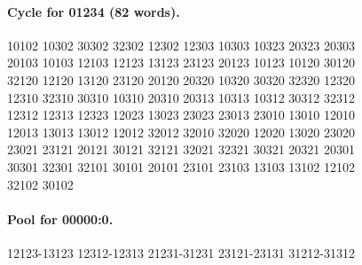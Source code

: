 \documentclass[11pt]{article}
\numberwithin{equation}{section}
\numberwithin{table}{section}
\begin{document}
\paragraph{Cycle for 01234 (82 words).}
\begingroup\footnotesize\ttfamily\begin{flushleft}
10102 10302 30302 32302 12302 12303 10303 10323 20323 20303\\
20103 10103 12103 12123 13123 23123 20123 10123 10120 30120\\
32120 12120 13120 23120 20120 20320 10320 30320 32320 12320\\
12310 32310 30310 10310 20310 20313 10313 10312 30312 32312\\
12312 12313 12323 12023 13023 23023 23013 23010 13010 12010\\
12013 13013 13012 12012 32012 32010 32020 12020 13020 23020\\
23021 23121 20121 30121 32121 32021 32321 30321 20321 20301\\
30301 32301 32101 30101 20101 23101 23103 13103 13102 12102\\
32102 30102\\
\end{flushleft}\endgroup
\paragraph{Pool for 00000:0.}
\begingroup\footnotesize\ttfamily\begin{flushleft}
12123-13123 12312-12313 21231-31231 23121-23131 31212-31312\\
\end{flushleft}\endgroup
\end{document}
